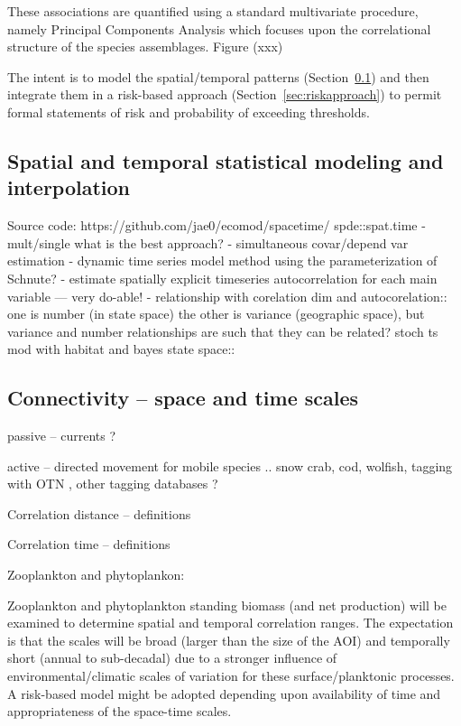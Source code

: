 \documentclass[letterpaper,portrait,11pt]{scrartcl}
\numberwithin{equation}{section}		%
\numberwithin{figure}{section}		%
\numberwithin{table}{section}				%
\begin{document}
These associations are quantified using a standard multivariate procedure, namely Principal Components Analysis which focuses upon the correlational structure of the species assemblages. Figure (xxx) 

The intent is to model the spatial/temporal patterns (Section~\ref{sec:interpolation}) and then integrate them in a risk-based approach (Section~\ref{sec:riskapproach}) to permit formal statements of risk and probability of exceeding thresholds. 

\clearpage
\subsection{Spatial and temporal statistical modeling and interpolation}
\label{sec:interpolation}
Source code: https://github.com/jae0/ecomod/spacetime/
	spde::spat.time
- mult/single what is the best approach?
- simultaneous covar/depend var estimation
- dynamic time series model method using the parameterization of Schnute?
- estimate spatially explicit timeseries autocorrelation for each main variable --- very do-able!
- relationship with corelation dim and autocorelation:: one is number (in state space) the other is variance (geographic space), but variance and number relationships are such that they can be related?
	stoch ts mod with habitat and bayes state space::


\subsection{Connectivity -- space and time scales}

passive -- currents ?

active -- directed movement for mobile species .. snow crab, cod, wolfish, tagging with OTN , other tagging databases ?



Correlation distance
-- definitions

Correlation time 
-- definitions

Zooplankton and phytoplankon:

Zooplankton and phytoplankton standing biomass (and net production) will be examined to determine spatial and temporal correlation ranges. The expectation is that the scales will be broad (larger than the size of the AOI) and temporally short (annual to sub-decadal) due to a stronger influence of environmental/climatic scales of variation for these surface/planktonic processes. A risk-based model might be adopted depending upon availability of time and appropriateness of the space-time scales.
\end{document}
